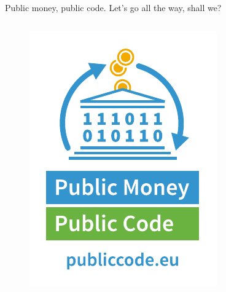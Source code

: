 \documentclass[aspectratio=169]{beamer}
\begin{document}
\begin{frame}{Public money, public code. Let's go all the way, shall we?}
\begin{columns}[T]
    \vspace{5mm}
    \begin{figure}
      \centering
      \includegraphics[width=\textwidth]{images/logos/FSFE_Public_Money_Public_Code_logo.pdf}
    \end{figure}
  \end{columns}
\end{frame}
\end{document}

